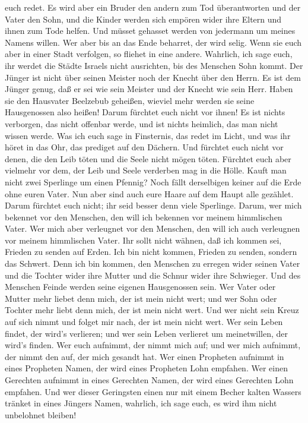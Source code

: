 euch redet.  Es wird aber ein Bruder den andern zum Tod
überantworten und der Vater den Sohn, und die Kinder werden sich empören
wider ihre Eltern und ihnen zum Tode helfen.  Und müsset
gehasset werden von jedermann um meines Namens willen. Wer aber bis an
das Ende beharret, der wird selig.  Wenn sie euch aber in
einer Stadt verfolgen, so fliehet in eine andere. Wahrlich, ich sage
euch, ihr werdet die Städte Israels nicht ausrichten, bis des Menschen
Sohn kommt.  Der Jünger ist nicht über seinen Meister noch
der Knecht über den Herrn.  Es ist dem Jünger genug, daß er
sei wie sein Meister und der Knecht wie sein Herr. Haben sie den
Hausvater Beelzebub geheißen, wieviel mehr werden sie seine Hausgenossen
also heißen!  Darum fürchtet euch nicht vor ihnen! Es ist
nichts verborgen, das nicht offenbar werde, und ist nichts heimlich, das
man nicht wissen werde.  Was ich euch sage in Finsternis,
das redet im Licht, und was ihr höret in das Ohr, das prediget auf den
Dächern.  Und fürchtet euch nicht vor denen, die den Leib
töten und die Seele nicht mögen töten. Fürchtet euch aber vielmehr vor
dem, der Leib und Seele verderben mag in die Hölle.  Kauft
man nicht zwei Sperlinge um einen Pfennig? Noch fällt derselbigen keiner
auf die Erde ohne euren Vater.  Nun aber sind auch eure
Haare auf dem Haupt alle gezählet.  Darum fürchtet euch
nicht; ihr seid besser denn viele Sperlinge.  Darum, wer
mich bekennet vor den Menschen, den will ich bekennen vor meinem
himmlischen Vater.  Wer mich aber verleugnet vor den
Menschen, den will ich auch verleugnen vor meinem himmlischen Vater.
 Ihr sollt nicht wähnen, daß ich kommen sei, Frieden zu
senden auf Erden. Ich bin nicht kommen, Frieden zu senden, sondern das
Schwert.  Denn ich bin kommen, den Menschen zu erregen
wider seinen Vater und die Tochter wider ihre Mutter und die Schnur
wider ihre Schwieger.  Und des Menschen Feinde werden seine
eigenen Hausgenossen sein.  Wer Vater oder Mutter mehr
liebet denn mich, der ist mein nicht wert; und wer Sohn oder Tochter
mehr liebt denn mich, der ist mein nicht wert.  Und wer
nicht sein Kreuz auf sich nimmt und folget mir nach, der ist mein nicht
wert.  Wer sein Leben findet, der wird's verlieren; und wer
sein Leben verlieret um meinetwillen, der wird's finden. 
Wer euch aufnimmt, der nimmt mich auf; und wer mich aufnimmt, der nimmt
den auf, der mich gesandt hat.  Wer einen Propheten
aufnimmt in eines Propheten Namen, der wird eines Propheten Lohn
empfahen. Wer einen Gerechten aufnimmt in eines Gerechten Namen, der
wird eines Gerechten Lohn empfahen.  Und wer dieser
Geringsten einen nur mit einem Becher kalten Wassers tränket in eines
Jüngers Namen, wahrlich, ich sage euch, es wird ihm nicht unbelohnet
bleiben!

